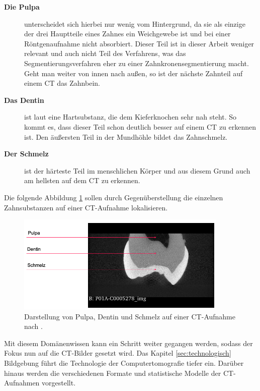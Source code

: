 \begin{description}
	\item[\textbf{Die Pulpa}] unterscheidet sich hierbei nur wenig vom Hintergrund,
		da sie als einzige der drei Hauptteile eines Zahnes ein Weichgewebe ist und
		bei einer Röntgenaufnahme nicht absorbiert. Dieser Teil ist in dieser Arbeit
		weniger relevant und auch nicht Teil des Verfahrens, was das
		Segmentierungsverfahren eher zu einer Zahnkronensegmentierung macht. Geht man
		weiter von innen nach außen, so ist der nächste Zahnteil auf einem \ac{CT} das
		Zahnbein.

	\item[\textbf{Das Dentin}] ist laut \citet[Seite 41]{lehmann2012Zahnheilkunde}
		eine Hartsubstanz, die dem Kieferknochen sehr nah steht. So kommt es, dass
		dieser Teil schon deutlich besser auf einem \ac{CT} zu erkennen ist. Den
		äußersten Teil in der Mundhöhle bildet das Zahnschmelz.

	\item[\textbf{Der Schmelz}] ist der härteste Teil im menschlichen Körper und aus
		diesem Grund auch am hellsten auf dem \ac{CT} zu erkennen.
\end{description}

Die folgende Abbildung \ref{fig:pulpa_dentin_schmelz} sollen durch
Gegenüberstellung die einzelnen Zahnsubstanzen auf einer \ac{CT}-Aufnahme lokalisieren.

\begin{figure}[h]
	\centering
	\includegraphics[width=0.9\textwidth]{img/dentin_schmelz_pulpa.png}
	\caption{Darstellung von Pulpa, Dentin und Schmelz auf einer \ac{CT}-Aufnahme
	nach \citet{heck2024}.}
	\label{fig:pulpa_dentin_schmelz}
\end{figure}

Mit diesem Domänenwissen kann ein Schritt weiter gegangen werden, sodass der Fokus
nun auf die \ac{CT}-Bilder gesetzt wird. Das Kapitel \ref{sec:technologisch} Bildgebung
führt die Technologie der Computertomografie tiefer ein. Darüber hinaus werden
die verschiedenen Formate und statistische Modelle der \ac{CT}-Aufnahmen vorgestellt.

